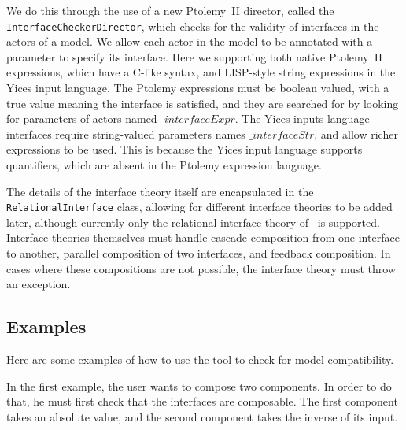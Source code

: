 \documentclass[preprint,11pt]{sigplanconf}
\begin{document}
We do this through the use of a new Ptolemy~II director, called the
\texttt{InterfaceCheckerDirector}, which checks for the validity of interfaces
in the actors of a model. We allow each actor in the model to be annotated with
a parameter to specify its interface. Here we supporting both native Ptolemy~II
expressions, which have a C-like syntax, and LISP-style string expressions in
the Yices input language. The Ptolemy expressions must be boolean valued, with
a true value meaning the interface is satisfied, and they are searched for by
looking for parameters of actors named $\_interfaceExpr$. The Yices inputs
language interfaces require string-valued parameters names $\_interfaceStr$,
and allow richer expressions to be used. This is because the Yices input
language supports quantifiers, which are absent in the Ptolemy expression
language.

The details of the interface theory itself are encapsulated in the
\texttt{RelationalInterface} class, allowing for different interface theories
to be added later, although currently only the relational interface theory
of~\cite{relationalInterfaces} is supported. Interface theories themselves must
handle cascade composition from one interface to another, parallel composition
of two interfaces, and feedback composition. In cases where these compositions
are not possible, the interface theory must throw an exception.

\subsection{Examples}
Here are some examples of how to use the tool to check for model compatibility.

In the first example, the user wants to compose two components.
In order to do that, he must first check that the interfaces are composable. 
The first component takes an absolute value, and the second component takes the
inverse of its input.
\end{document}
